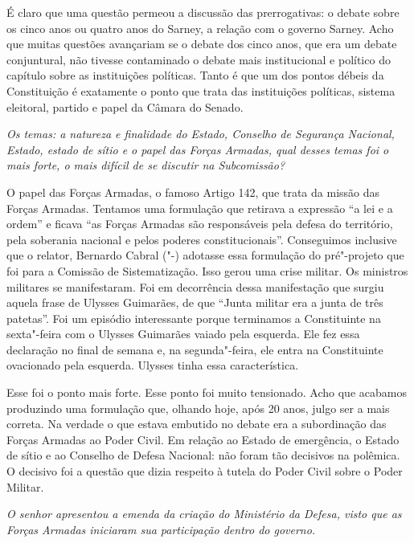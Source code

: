 É claro que uma questão permeou a discussão das prerrogativas: o debate
sobre os cinco anos ou quatro anos do Sarney, a relação com o governo
Sarney. Acho que muitas questões avançariam se o debate dos cinco anos,
que era um debate conjuntural, não tivesse contaminado o debate mais
institucional e político do capítulo sobre as instituições políticas.
Tanto é que um dos pontos débeis da Constituição é exatamente o ponto
que trata das instituições políticas, sistema eleitoral, partido e papel
da Câmara do Senado.

\medskip

\noindent\emph{Os temas: a natureza e finalidade do Estado, Conselho de
Segurança Nacional, Estado, estado de sítio e o papel das Forças
Armadas, qual desses temas foi o mais forte, o mais difícil de se
discutir na Subcomissão?}

O papel das Forças Armadas, o famoso Artigo 142, que
trata da missão das Forças Armadas. Tentamos uma formulação que retirava
a expressão ``a lei e a ordem'' e ficava ``as Forças Armadas são
responsáveis pela defesa do território, pela soberania nacional e pelos
poderes constitucionais''. Conseguimos inclusive que o relator, Bernardo
Cabral ("-) adotasse essa formulação do pré"-projeto que foi para a
Comissão de Sistematização. Isso gerou uma crise militar. Os ministros
militares se manifestaram. Foi em decorrência dessa manifestação que
surgiu aquela frase de Ulysses Guimarães, de que ``Junta militar era a
junta de três patetas''. Foi um episódio interessante porque terminamos
a Constituinte na sexta"-feira com o Ulysses Guimarães vaiado pela
esquerda. Ele fez essa declaração no final de semana e, na segunda"-feira, ele entra na Constituinte ovacionado pela esquerda. Ulysses tinha essa característica.

Esse foi o ponto mais forte. Esse ponto foi muito tensionado. Acho que
acabamos produzindo uma formulação que, olhando hoje, após 20 anos,
julgo ser a mais correta. Na verdade o que estava embutido no debate era
a subordinação das Forças Armadas ao Poder Civil. Em relação ao Estado
de emergência, o Estado de sítio e ao Conselho de Defesa Nacional: não
foram tão decisivos na polêmica. O decisivo foi a questão que dizia
respeito à tutela do Poder Civil sobre o Poder Militar.

\medskip

\noindent\emph{O senhor apresentou a emenda da criação do Ministério da Defesa,
visto que as Forças Armadas iniciaram sua participação dentro do
governo.}

